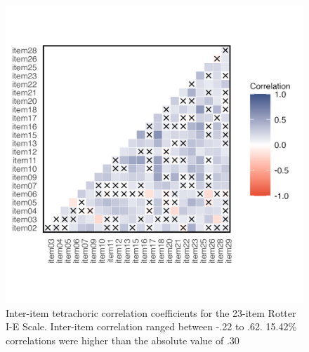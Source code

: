 \documentclass[
  man]{apa6}
\begin{document}
\begin{figure}

{\centering \includegraphics[width=1\linewidth,height=1.5\textheight]{figures/300/Figure1} 

}

\caption{Inter-item tetrachoric correlation coefficients for the 23-item Rotter I-E Scale. Inter-item correlation ranged between -.22 to .62. 15.42\% correlations were higher than the absolute value of .30}\label{fig:figCor}
\end{figure}
\end{document}

